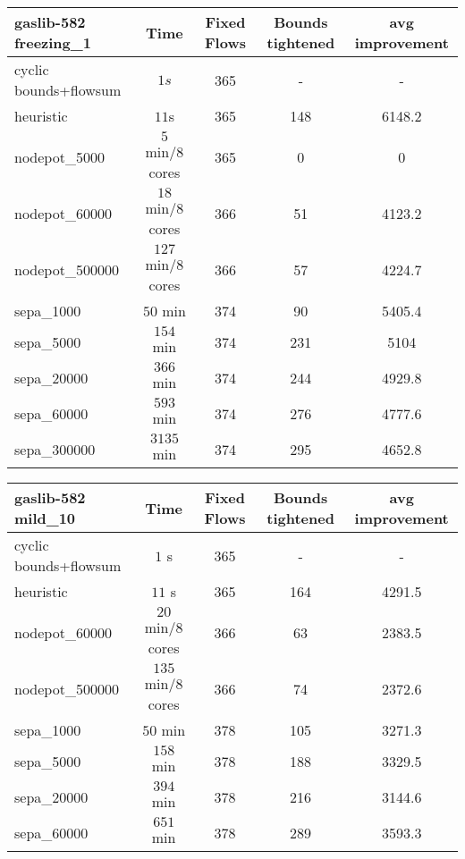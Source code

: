 \begin{center}
\begin{tabular}{ l | c | c | c | c }

\textbf{gaslib-582 freezing\_1} & Time  & Fixed Flows & Bounds tightened & avg improvement\\
\hline
 cyclic bounds+flowsum& $1s$ & 365 & - & - \\
 heuristic& $ 11$s& 365& 148 & 6148.2\\
 nodepot\_5000& $ 5$ min/8 cores & 365 & 0 & 0 \\ 
 nodepot\_60000& $18$ min/8 cores & 366 & 51 & 4123.2 \\ 
 nodepot\_500000& $127$ min/8 cores &366  & 57 & 4224.7 \\ 
 sepa\_1000& $50$ min & 374 & 90 & 5405.4 \\
 sepa\_5000& $ 154$ min & 374 & 231 & 5104  \\
 sepa\_20000& $366$ min & 374 & 244 & 4929.8 \\
 sepa\_60000& $593$ min & 374 & 276 & 4777.6\\
 sepa\_300000& $3135$ min & 374 & 295 & 4652.8\\
\end{tabular} 
\end{center}

\begin{center}
\begin{tabular}{ l | c | c | c | c }

\textbf{gaslib-582 mild\_10} & Time  & Fixed Flows & Bounds tightened & avg improvement\\
\hline
 cyclic bounds+flowsum& $1$ s& 365 & - & -\\
 heuristic& $11$ s& 365 & 164 & 4291.5\\
 nodepot\_60000& $20$ min/8 cores & 366 & 63 & 2383.5 \\ 
 nodepot\_500000& $135$ min/8 cores & 366 & 74 & 2372.6 \\ 
 sepa\_1000& $50$ min & 378 & 105 & 3271.3 \\
 sepa\_5000& $ 158$ min  & 378 & 188 & 3329.5 \\
 sepa\_20000& $ 394$ min & 378 & 216 &3144.6 \\
 sepa\_60000& $651$ min  & 378& 289 & 3593.3 \\
\end{tabular} 
\end{center}

